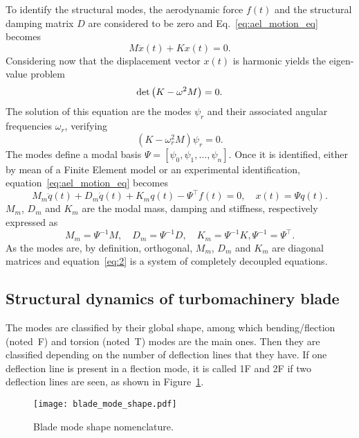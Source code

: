 To identify the structural modes, the aerodynamic force $f(t)$ and
the structural damping matrix $D$ are considered to be zero
and Eq.~\eqref{eq:ael_motion_eq} becomes
\begin{equation}
	M \ddot{x}(t) + K x(t) = 0.
	\label{eq:ael_motion_eq_free_response}
\end{equation}
Considering now that the displacement vector $x(t)$ is harmonic
yields the eigen-value problem
\begin{equation}
	\mdet \left(K - \omega^2 M  \right) = 0.
	\label{eq:ael_motion_eq_eigen_value}
\end{equation}
The solution of this equation are the modes $\psi_r$
and their associated angular frequencies $\omega_r$, verifying
\begin{equation}
	\left(K - \omega_r^2 M  \right) \psi_r = 0.
\end{equation}
The modes define a modal basis 
$\Psi = [\psi_0, \psi_1, \dots, \psi_n]$.
Once it
is identified, either by mean of a Finite
Element model or an experimental identification, 
equation~\ref{eq:ael_motion_eq} becomes
\begin{equation}
  \label{eq:2}
  M_m \ddot{q}(t) + D_m \dot{q}(t) + K_m q (t) - \Psi^\top f(t)=0, \quad x(t) = \Psi q(t).
\end{equation}
$M_m$, $D_m$ and $K_m$ are the modal mass, 
damping and stiffness, respectively expressed as
\begin{equation}
    M_m = \Psi ^{-1} M, \quad D_m = \Psi ^{-1} D, \quad K_m = \Psi ^{-1} K, \Psi ^{-1}  = \Psi ^\top.
\end{equation}
As the modes are, by definition, orthogonal,
$M_m$, $D_m$ and $K_m$ are diagonal matrices and
equation~\eqref{eq:2} is a system of completely decoupled equations.

\subsection{Structural dynamics of turbomachinery blade}
\label{sub:structural_dynamics_of_turbomachinery_blade}

The modes are classified by their global shape, among which 
bending/flection (noted~F) and torsion (noted~T) 
modes are the main ones. Then they are classified
depending on the number of deflection lines that they
have. If one deflection line is present in a flection 
mode, it is called 1F and 2F if two deflection lines are
seen, as shown in Figure~\ref{fig:blade_mode_shape}.
\begin{figure}[htp]
  \centering
  \texttt{[image: blade\_mode\_shape.pdf]}
  \caption{Blade mode shape nomenclature.}
  \label{fig:blade_mode_shape}
\end{figure}

